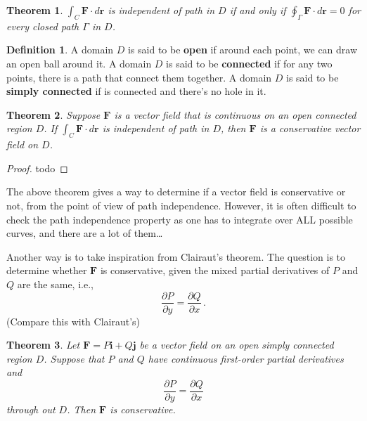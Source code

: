 \documentclass[
]{article}
\newtheorem{theorem}{Theorem}[section]
\theoremstyle{definition}
\newtheorem{definition}{Definition}[section]
\theoremstyle{definition}
\theoremstyle{definition}
\theoremstyle{definition}
\theoremstyle{remark}
\begin{document}
\begin{theorem}
\(\int_C \mathbf{F}\cdot d\mathbf{r}\) is independent of path in \(D\) if and only if
\(\oint_\Gamma \mathbf{F} \cdot d\mathbf{r} = 0\) for every closed path \(\Gamma\) in \(D\).
\end{theorem}

\begin{definition}
A domain \(D\) is said to be \textbf{open} if around each point, we can draw an open ball around it.
A domain \(D\) is said to be \textbf{connected} if for any two points, there is a path that connect them
together.
A domain \(D\) is said to be \textbf{simply connected} if is connected and there's no hole in it.
\end{definition}

\begin{theorem}
Suppose \(\mathbf{F}\) is a vector field that is continuous on an open
connected region \(D\).
If \(\int_C \mathbf{F} \cdot d \mathbf{r}\) is independent of path in \(D\),
then \(\mathbf{F}\) is a conservative vector field on \(D\).
\end{theorem}

\begin{proof}
todo
\end{proof}

The above theorem gives a way to determine if a vector field is conservative or not, from
the point of view of path independence.
However, it is often difficult to check the path independence property as one has to
integrate over ALL possible curves, and there are a lot of them\ldots{}

Another way is to take inspiration from Clairaut's theorem.
The question is to determine whether \(\mathbf{F}\) is conservative, given the mixed partial
derivatives of \(P\) and \(Q\) are the same, i.e.,
\begin{equation*}
    \frac{\partial P}{\partial y} = \frac{\partial Q}{\partial x}\,.
\end{equation*}
(Compare this with Clairaut's)

\begin{theorem}
Let \(\mathbf{F} = P\mathbf{i} + Q\mathbf{j}\) be a vector field on an open simply connected
region \(D\). Suppose that
\(P\) and \(Q\) have continuous first-order partial derivatives and
\begin{equation*}
    \frac{\partial P}{\partial y} = \frac{\partial Q}{\partial x}
\end{equation*}
through out \(D\).
Then \(\mathbf{F}\) is conservative.
\end{theorem}
\end{document}

